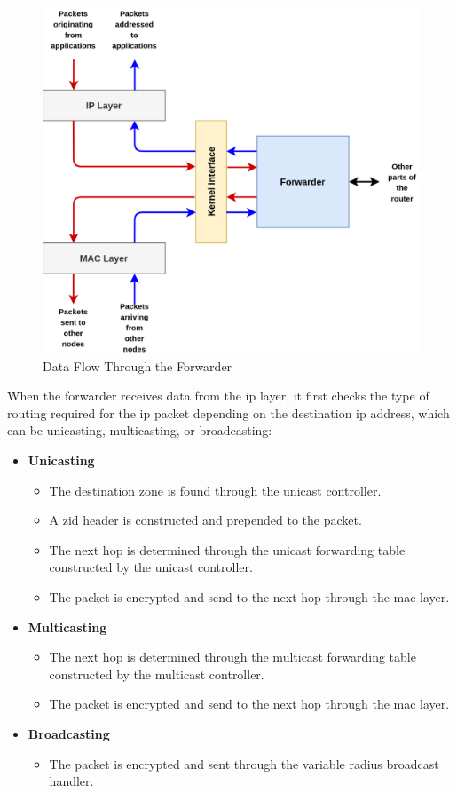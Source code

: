 \begin{figure}[!htb]
    \centering
    \includegraphics[width=0.9\linewidth]{images/forwarder-data-flow.png}
    \caption{Data Flow Through the Forwarder}
    \label{fig:forwarder-data-flow}
\end{figure}

When the forwarder receives data from the \acrshort{ip} layer, it first checks the type of routing required for the \acrshort{ip} packet depending on the destination \acrshort{ip} address, which can be unicasting, multicasting, or broadcasting:
\begin{itemize}[itemsep=1pt, topsep=5pt]
    \item \textbf{Unicasting}
    \begin{itemize}[itemsep=1pt, topsep=5pt]
        \item The destination zone is found through the unicast controller.
        \item A \acrshort{zid} header is constructed and prepended to the packet.
        \item The next hop is determined through the unicast forwarding table constructed by the unicast controller.
        \item The packet is encrypted and send to the next hop through the \acrshort{mac} layer.
    \end{itemize}
    \item \textbf{Multicasting}
    \begin{itemize}[itemsep=1pt, topsep=5pt]
        \item The next hop is determined through the multicast forwarding table constructed by the multicast controller.
        \item The packet is encrypted and send to the next hop through the \acrshort{mac} layer.
    \end{itemize}
    \item \textbf{Broadcasting}
    \begin{itemize}[itemsep=1pt, topsep=5pt]
        \item The packet is encrypted and sent through the variable radius broadcast handler.
    \end{itemize}
\end{itemize}

